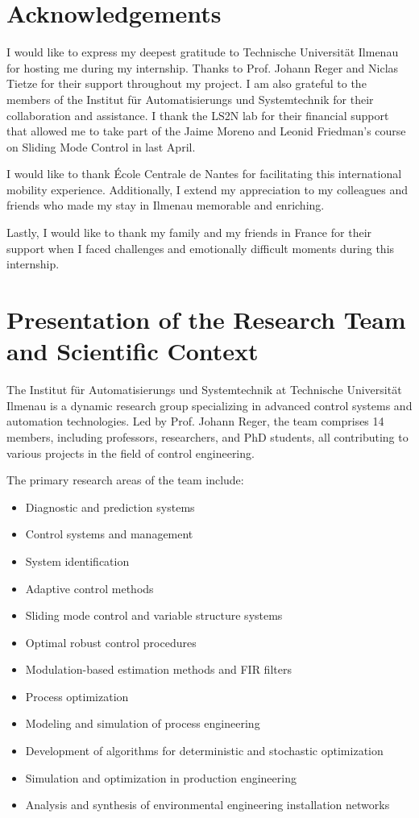 \chapter*{Acknowledgements}

I would like to express my deepest gratitude to Technische Universität 
Ilmenau for hosting me during my internship. Thanks to Prof. Johann Reger and
Niclas Tietze for their support throughout my project. I am also 
grateful to the members of the Institut für Automatisierungs und 
Systemtechnik for their collaboration and assistance. I thank the LS2N lab
for their financial support that allowed me to take part of the Jaime Moreno
and Leonid Friedman's course on Sliding Mode Control in last April.

I would like to thank École Centrale de Nantes for facilitating this international mobility 
experience. Additionally, I extend my appreciation to my colleagues and friends 
who made my stay in Ilmenau memorable and enriching. 

Lastly, I would like to thank my family and my friends in France for their 
support when I faced challenges and emotionally difficult moments during
this internship.

\chapter{Presentation of the Research Team and Scientific Context}


The Institut für Automatisierungs und Systemtechnik at Technische Universität Ilmenau is a dynamic research group specializing in advanced control systems and automation technologies. Led by Prof. Johann Reger, the team comprises 14 members, including professors, researchers, and PhD students, all contributing to various projects in the field of control engineering.


The primary research areas of the team include:
\begin{itemize}
    \item Diagnostic and prediction systems
    \item Control systems and management
    \item System identification
    \item Adaptive control methods
    \item Sliding mode control and variable structure systems
    \item Optimal robust control procedures
    \item Modulation-based estimation methods and FIR filters
    \item Process optimization
    \item Modeling and simulation of process engineering
    \item Development of algorithms for deterministic and stochastic optimization
    \item Simulation and optimization in production engineering
    \item Analysis and synthesis of environmental engineering installation networks
\end{itemize}

